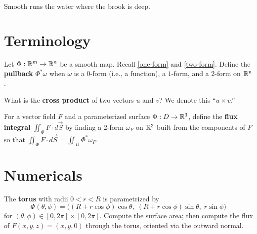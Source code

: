 \documentclass{homework}
\author{Jim Fowler}
\begin{document}
\maketitle

\begin{inspiration}
Smooth runs the water where the brook is deep.
\end{inspiration}

\section{Terminology}

\begin{problem}\label{pullback-definition}%
  Let $\Phi:\mathbb{R}^m\to\mathbb{R}^n$ be a smooth map.
  Recall \ref{one-form} and \ref{two-form}.
  Define the \textbf{pullback} $\Phi^*\omega$ when $\omega$ is a $0$-form (i.e., a function),
  a $1$-form, and a $2$-form on $\mathbb{R}^n$.
\end{problem}

\begin{problem}
  What is the \textbf{cross product} of two vectors $u$ and $v$? We denote this ``$u \times v$.''
\end{problem}

\begin{problem}\label{flux-definition}%
  For a vector field $F$ and a parameterized surface $\Phi:D\to\mathbb{R}^3$, define the \textbf{flux integral} $\displaystyle\iint_\Phi F\cdot d\vec{S}$ by finding
  a $2$-form $\omega_F$ on $\mathbb{R}^3$ built from the components of $F$ so that
  \(\displaystyle\iint_\Phi F\cdot d\vec{S} = \iint_D \Phi^*\omega_F\).
\end{problem}

\section{Numericals}

\begin{problem}\label{torus-area}%
  The \textbf{torus} with radii $0<r<R$ is parametrized by
  \[
    \Phi(\theta,\phi)=\bigl((R+r\cos\phi)\cos\theta,\;(R+r\cos\phi)\sin\theta,\;r\sin\phi\bigr)
  \]
  for $(\theta,\phi)\in[0,2\pi]\times[0,2\pi]$.
  Compute the surface area; then compute the flux of $F(x,y,z)=(x,y,0)$ through the torus, oriented via the outward normal.
\end{problem}
\end{document}
